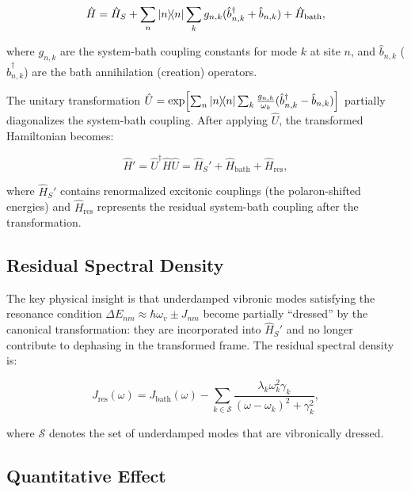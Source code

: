 \documentclass[11pt,a4paper]{article}
\begin{document}
\begin{equation}
\hat{H} = \hat{H}_S + \sum_n \dyad{n} \sum_k g_{n,k}(\hat{b}_{n,k}^\dagger + \hat{b}_{n,k}) + \hat{H}_{\mathrm{bath}},
\label{eq:SI_full_hamiltonian}
\end{equation}

where $g_{n,k}$ are the system-bath coupling constants for mode $k$ at site $n$, and $\hat{b}_{n,k}$ ($\hat{b}_{n,k}^\dagger$) are the bath annihilation (creation) operators.

The unitary transformation $\hat{U} = \exp\!\left[\sum_n \dyad{n} \sum_k \frac{g_{n,k}}{\omega_k}(\hat{b}_{n,k}^\dagger - \hat{b}_{n,k})\right]$ partially diagonalizes the system-bath coupling.
After applying $\hat{U}$, the transformed Hamiltonian becomes:

\begin{equation}
\hat{H}' = \hat{U}^\dagger \hat{H} \hat{U} = \hat{H}_S' + \hat{H}_{\mathrm{bath}} + \hat{H}_{\mathrm{res}},
\label{eq:SI_lf_hamiltonian}
\end{equation}

where $\hat{H}_S'$ contains renormalized excitonic couplings (the polaron-shifted energies) and $\hat{H}_{\mathrm{res}}$ represents the residual system-bath coupling after the transformation.

\subsection{Residual Spectral Density}

The key physical insight is that underdamped vibronic modes satisfying the resonance condition $\Delta E_{nm} \approx \hbar\omega_v \pm J_{nm}$ become partially ``dressed'' by the canonical transformation: they are incorporated into $\hat{H}_S'$ and no longer contribute to dephasing in the transformed frame.
The residual spectral density is:

\begin{equation}
J_{\mathrm{res}}(\omega) = J_{\mathrm{bath}}(\omega) - \sum_{k \in \mathcal{S}} \frac{\lambda_k \omega_k^2 \gamma_k}{(\omega - \omega_k)^2 + \gamma_k^2},
\label{eq:SI_residual_spectral}
\end{equation}

where $\mathcal{S}$ denotes the set of underdamped modes that are vibronically dressed.

\subsection{Quantitative Effect}
\end{document}

